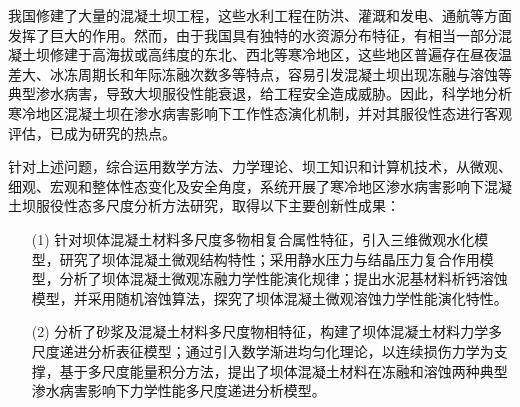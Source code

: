 \begin{preface}
我国修建了大量的混凝土坝工程，这些水利工程在防洪、灌溉和发电、通航等方面发挥了巨大的作用。然而，由于我国具有独特的水资源分布特征，有相当一部分混凝土坝修建于高海拔或高纬度的东北、西北等寒冷地区，这些地区普遍存在昼夜温差大、冰冻周期长和年际冻融次数多等特点，容易引发混凝土坝出现冻融与溶蚀等典型渗水病害，导致大坝服役性能衰退，给工程安全造成威胁。因此，科学地分析寒冷地区混凝土坝在渗水病害影响下工作性态演化机制，并对其服役性态进行客观评估，已成为研究的热点。\par
针对上述问题，综合运用数学方法、力学理论、坝工知识和计算机技术，从微观、细观、宏观和整体性态变化及安全角度，系统开展了寒冷地区渗水病害影响下混凝土坝服役性态多尺度分析方法研究，取得以下主要创新性成果：	
\begin{enumerate}
	\item[(1)] 针对坝体混凝土材料多尺度多物相复合属性特征，引入三维微观水化模型，研究了坝体混凝土微观结构特性；采用静水压力与结晶压力复合作用模型，分析了坝体混凝土微观冻融力学性能演化规律；提出水泥基材料析钙溶蚀模型，并采用随机溶蚀算法，探究了坝体混凝土微观溶蚀力学性能演化特性。
	\item[(2)] 分析了砂浆及混凝土材料多尺度物相特征，构建了坝体混凝土材料力学多尺度递进分析表征模型；通过引入数学渐进均匀化理论，以连续损伤力学为支撑，基于多尺度能量积分方法，提出了坝体混凝土材料在冻融和溶蚀两种典型渗水病害影响下力学性能多尺度递进分析模型。	
\end{enumerate}
	
\end{preface}